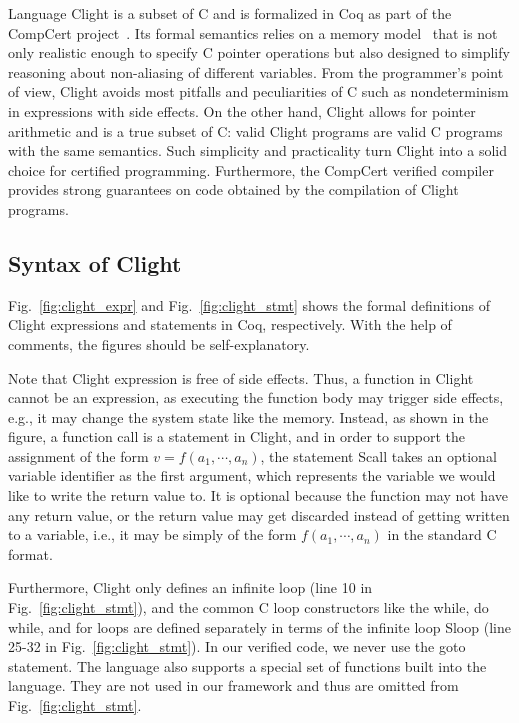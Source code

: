 Language Clight is a subset of C and is
formalized in Coq as part of the CompCert project~\cite{compcert}.  Its formal
semantics relies on a memory model~\cite{leroy08} that is not only
realistic enough to specify C pointer operations but also designed to
simplify reasoning about non-aliasing of different variables.
From the programmer's point of view, 
Clight avoids most pitfalls and peculiarities of C such
as nondeterminism in expressions with side effects. 
On the other hand,
Clight allows for pointer arithmetic and is a true subset of C: valid
Clight programs are valid C programs with the same semantics.
Such simplicity and practicality turn Clight into a solid choice for
certified programming.
Furthermore, the CompCert verified compiler
provides strong guarantees on code
obtained by the compilation of Clight programs.

\subsection{Syntax of Clight}

Fig.~\ref{fig:clight_expr} and Fig.~\ref{fig:clight_stmt} shows the formal
definitions of Clight expressions and statements in Coq, respectively.
With the help of comments, the figures should be self-explanatory.

Note that Clight expression is free of side effects. Thus, a function
in Clight cannot be an expression, as executing the function body
may trigger side effects, e.g., it may change the system state like the memory.
Instead, as shown in the figure, a function call is a statement in Clight,
and in order to support the assignment of the form $v = f(a_1, \cdots, a_n)$, the
statement \textsf{Scall} takes an optional variable identifier as the first  argument,
which represents the variable we would like to write the return value to.
It is optional because the function may not have any return value, or the return
value may get discarded instead of getting written to a variable, i.e.,
it may be simply of the form $f(a_1, \cdots, a_n)$ in the standard C format.

Furthermore, Clight only defines an infinite loop
(line 10 in Fig.~\ref{fig:clight_stmt}), and the common C loop constructors
like the \textsf{while}, \textsf{do while}, and \textsf{for} loops are defined
separately in terms of the infinite loop \textsf{Sloop} (line 25-32
in Fig.~\ref{fig:clight_stmt}). 
In our verified code, we never use
the \textsf{goto} statement.
The language also supports a special set of functions built into the language.
They are not used in our framework and thus are omitted from Fig.~\ref{fig:clight_stmt}.

